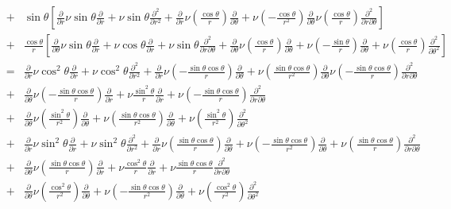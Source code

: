 \documentclass[11pt,letterpaper]{article}
\begin{document}
\begin{eqnarray}
&+& \sin\theta   [\frac{\partial}{\partial r} \nu \sin\theta\frac{\partial}{\partial r} + \nu\sin\theta\frac{\partial^2}{\partial r^2} + \frac{\partial}{\partial r} \nu (\frac{\cos\theta}{r})\frac{\partial}{\partial \theta} + \nu(-\frac{\cos\theta}{r^2})\frac{\partial}{\partial \theta} \nu (\frac{\cos\theta}{r})\frac{\partial^2}{\partial r \partial \theta} ]\\
&+& \frac{\cos\theta}{r} [\frac{\partial}{\partial \theta} \nu \sin\theta \frac{\partial}{\partial r} + \nu \cos\theta \frac{\partial}{\partial r} + \nu \sin\theta \frac{\partial^2}{\partial r \partial \theta} + \frac{\partial}{\partial \theta} \nu (\frac{\cos\theta}{r}) \frac{\partial}{\partial \theta} + \nu(-\frac{\sin\theta}{r})\frac{\partial}{\partial \theta} + \nu(\frac{\cos\theta}{r})\frac{\partial^2}{\partial\theta^2}]\\
&=& \frac{\partial}{\partial r} \nu \cos^2\theta\frac{\partial}{\partial r} + \nu\cos^2\theta\frac{\partial^2}{\partial r^2} + \frac{\partial}{\partial r} \nu (-\frac{\sin\theta\cos\theta}{r})\frac{\partial}{\partial \theta} + \nu(\frac{\sin\theta\cos\theta}{r^2})\frac{\partial}{\partial \theta} \nu (-\frac{\sin\theta\cos\theta}{r})\frac{\partial^2}{\partial r \partial \theta}\\
&+& \frac{\partial}{\partial \theta} \nu (-\frac{\sin\theta\cos\theta}{r})\frac{\partial}{\partial r} + \nu \frac{\sin^2\theta}{r} \frac{\partial}{\partial r} + \nu (-\frac{\sin\theta\cos\theta}{r})\frac{\partial^2}{\partial r \partial \theta} \\
&+& \frac{\partial}{\partial \theta} \nu (\frac{\sin^2\theta}{r^2}) \frac{\partial}{\partial \theta} + \nu(\frac{\sin\theta\cos\theta}{r^2})\frac{\partial}{\partial \theta} + \nu(\frac{\sin^2\theta}{r^2})\frac{\partial^2}{\partial\theta^2}\\
&+& \frac{\partial}{\partial r} \nu \sin^2\theta\frac{\partial}{\partial r} + \nu\sin^2\theta\frac{\partial^2}{\partial r^2} + \frac{\partial}{\partial r} \nu (\frac{\sin\theta\cos\theta}{r})\frac{\partial}{\partial \theta} + \nu(-\frac{\sin\theta\cos\theta}{r^2})\frac{\partial}{\partial \theta} + \nu (\frac{\sin\theta\cos\theta}{r})\frac{\partial^2}{\partial r \partial \theta} \\
&+& \frac{\partial}{\partial \theta} \nu (\frac{\sin\theta\cos\theta}{r}) \frac{\partial}{\partial r} + \nu \frac{\cos^2\theta}{r} \frac{\partial}{\partial r} + \nu \frac{\sin\theta\cos\theta}{r} \frac{\partial^2}{\partial r \partial \theta} \\
&+& \frac{\partial}{\partial \theta} \nu (\frac{\cos^2\theta}{r^2}) \frac{\partial}{\partial \theta} + \nu(-\frac{\sin\theta\cos\theta}{r^2})\frac{\partial}{\partial \theta} + \nu(\frac{\cos^2\theta}{r^2})\frac{\partial^2}{\partial\theta^2}\\

\end{eqnarray}
\end{document}

